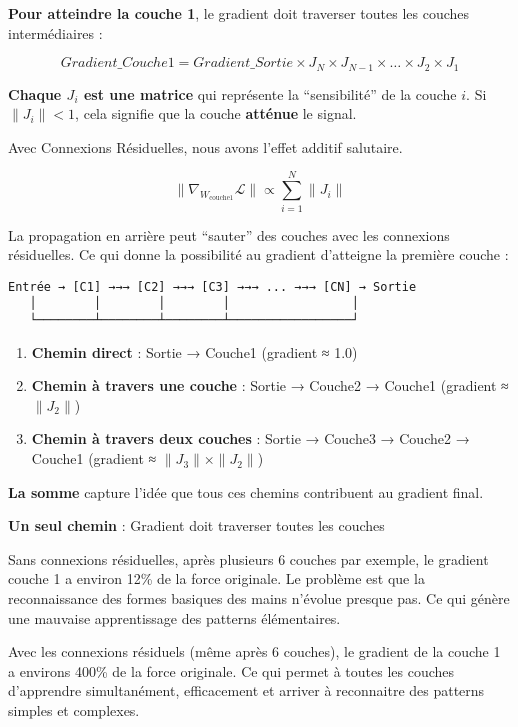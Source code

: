 \documentclass[12pt]{article}
\providecommand{\tightlist}{%
      \setlength{\itemsep}{0pt}\setlength{\parskip}{0pt}}
\begin{document}
\textbf{Pour atteindre la couche 1}, le gradient doit traverser toutes
les couches intermédiaires :

\[
Gradient\_Couche1 = Gradient\_Sortie \times J_N \times J_{N-1} \times \ldots \times J_2 \times J_1
\]

\textbf{Chaque \(J_i\) est une matrice} qui représente la
``sensibilité'' de la couche \(i\). Si \(\|J_i\| < 1\), cela signifie
que la couche \textbf{atténue} le signal.

Avec Connexions Résiduelles, nous avons l'effet additif salutaire.

\[\|\nabla_{W_{\text{couche1}}} \mathcal{L}\| \propto \sum_{i=1}^{N} \|J_i\|\]

La propagation en arrière peut ``sauter'' des couches avec les
connexions résiduelles. Ce qui donne la possibilité au gradient
d'atteigne la première couche :

\begin{verbatim}
Entrée → [C1] →→→ [C2] →→→ [C3] →→→ ... →→→ [CN] → Sortie
   │        │        │        │                 │
   └────────┴────────┴────────┴─────────────────┘
\end{verbatim}

\begin{enumerate}
\def\labelenumi{\arabic{enumi}.}
\tightlist
\item
  \textbf{Chemin direct} : Sortie → Couche1 (gradient ≈ 1.0)
\item
  \textbf{Chemin à travers une couche} : Sortie → Couche2 → Couche1
  (gradient ≈ \(\|J_2\|\))
\item
  \textbf{Chemin à travers deux couches} : Sortie → Couche3 → Couche2 →
  Couche1 (gradient ≈ \(\|J_3\| \times \|J_2\|\))
\end{enumerate}

\textbf{La somme} capture l'idée que tous ces chemins contribuent au
gradient final.

\textbf{Un seul chemin} : Gradient doit traverser toutes les couches

Sans connexions résiduelles, après plusieurs 6 couches par exemple, le
gradient couche 1 a environ 12\% de la force originale. Le problème est
que la reconnaissance des formes basiques des mains n'évolue presque
pas. Ce qui génère une mauvaise apprentissage des patterns élémentaires.

Avec les connexions résiduels (même après 6 couches), le gradient de la
couche 1 a environs 400\% de la force originale. Ce qui permet à toutes
les couches d'apprendre simultanément, efficacement et arriver à
reconnaitre des patterns simples et complexes.
\end{document}

